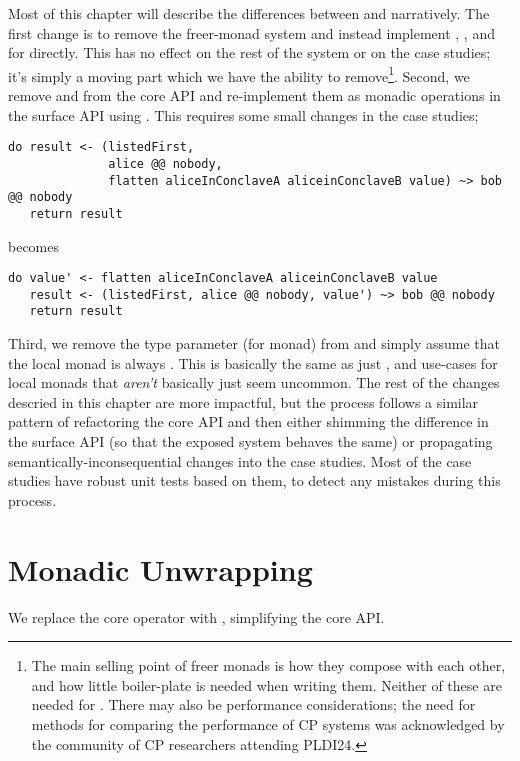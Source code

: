 Most of this chapter will describe the differences between \MultiChor and \minichor narratively.
The first change is to remove the freer-monad system and instead implement , , and 
for  directly.
This has no effect on the rest of the system or on the case studies;
it's simply a moving part which we have the ability to remove\footnote{
	The main selling point of freer monads is how they compose with each other,
	and how little boiler-plate is needed when writing them.
	Neither of these are needed for \minichor.
	There may also be performance considerations;
	the need for methods for comparing the performance of CP systems was acknowledged by the community
  of CP researchers attending PLDI24.
	}.
Second, we remove  and  from the core API and re-implement them as
monadic operations in the surface API using .
This requires some small changes in the case studies; \eg
\begin{verbatim}
do result <- (listedFirst,
              alice @@ nobody,
              flatten aliceInConclaveA aliceinConclaveB value) ~> bob @@ nobody
   return result
\end{verbatim}
becomes
\begin{verbatim}
do value' <- flatten aliceInConclaveA aliceinConclaveB value
   result <- (listedFirst, alice @@ nobody, value') ~> bob @@ nobody
   return result
\end{verbatim}
Third, we remove the type parameter  (for monad) from 
and simply assume that the local monad is always .
This is basically the same as just , and use-cases for local monads that \emph{aren't} basically just 
seem uncommon.
The rest of the changes descried in this chapter are more impactful,
but the process follows a similar pattern of refactoring the core API and then either shimming the difference in the surface API
(so that the exposed system behaves the same)
or propagating semantically-inconsequential changes into the case studies.
Most of the case studies have robust unit tests based on them, to detect any mistakes during this process.

\section{Monadic Unwrapping}
\label{sec:minichor-stg1}
We replace the core operator  with , simplifying the core API.

